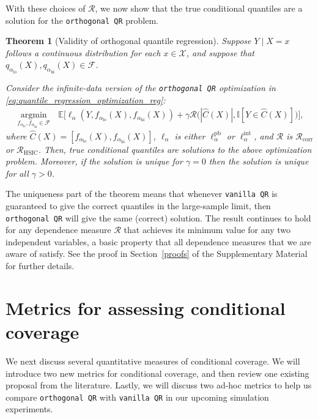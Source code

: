 \documentclass{article}
\newtheorem{theorem}{Theorem}
\begin{document}
With these choices of $\mathcal{R}$, we now show that the true conditional quantiles are a solution for the \texttt{orthogonal QR} problem.

\begin{theorem}[Validity of orthogonal quantile regression]\label{thm:oqr_validity}
Suppose $Y \mid X = x$ follows a continuous distribution for each $x \in \mathcal{X}$, and suppose that 
$q_{\alpha_{\textrm{lo}}}(X), q_{\alpha_{\textrm{hi}}}(X) \in \mathcal{F}$.

Consider the infinite-data version of the \textnormal{\texttt{orthogonal QR}} optimization in \eqref{eq:quantile_regression_optimization_reg}:
\begin{equation*}
    \begin{gathered} \operatorname*{argmin}_{f_{\alpha_{\textrm{lo}}}, f_{\alpha_{\textrm{hi}}} \in \mathcal{F}} \ \ \ { \mathbb{E} \big[{\ell_{\alpha}(Y,f_{\alpha_{\textrm{lo}}}(X), f_{\alpha_{\textrm{hi}}}(X))} + \gamma \mathcal{R}\big(|\hat{C}(X)|,  \mathbb{I}[Y \in \hat{C}(X)]\big)\big]},
\end{gathered}
\end{equation*}
where $\hat{C}(X) = [f_{\alpha_{\textrm{lo}}}(X), f_{\alpha_{\textrm{hi}}}(X)]$, $\ell_\alpha$ is either $\ell^\textrm{pb}_\alpha$ or $\ell^\textrm{int}_\alpha$, and $\mathcal{R}$ is $\mathcal{R}_\textrm{corr}$ or $\mathcal{R}_\textrm{HSIC}$. Then, true conditional quantiles are solutions to the above optimization problem. Moreover, if the solution is unique for $\gamma = 0$ then the solution is unique for all $\gamma > 0$.
\end{theorem}
The uniqueness part of the theorem means that whenever \texttt{vanilla QR} is guaranteed to give the correct quantiles in the large-sample limit, then \texttt{orthogonal QR} will give the same (correct) solution. The result continues to hold for any dependence measure $\mathcal{R}$ that achieves its minimum value for any two independent variables, a basic property that all dependence measures that we are aware of satisfy. See the proof in Section~\ref{proofs} of the Supplementary Material for further details.


\section{Metrics for assessing conditional coverage}\label{metrics_section}
We next discuss several quantitative measures of conditional coverage. We will introduce two new metrics for conditional coverage, and then review one existing proposal from the literature. Lastly, we will discuss two ad-hoc metrics to help us compare \texttt{orthogonal QR} with \texttt{vanilla QR} in our upcoming simulation experiments.
\end{document}
